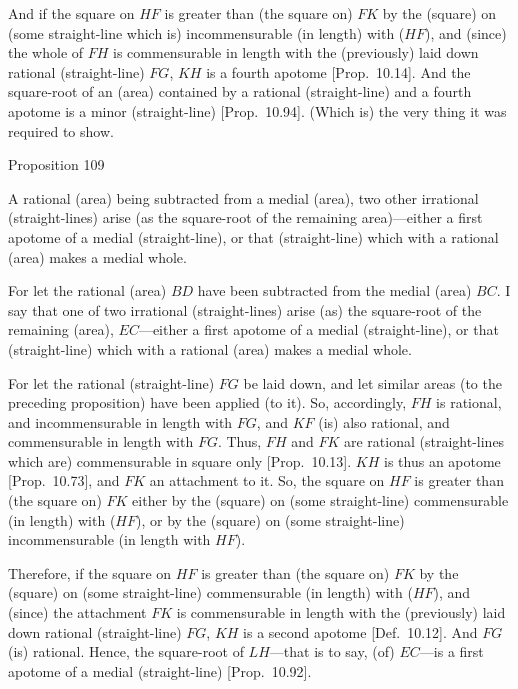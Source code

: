 And if the square on  $HF$ is greater than (the square on) $FK$ by the
(square) on (some straight-line which is) incommensurable (in length) with ($HF$),
and (since) the whole of $FH$ is commensurable in length with
the (previously) laid down rational (straight-line) $FG$, $KH$ is a fourth
apotome [Prop.~10.14]. And the square-root
of an (area) contained by a rational (straight-line) and a fourth apotome
is a minor (straight-line)
[Prop.~10.94]. (Which is) the very thing it was required to show.


\begin{center}
{\large Proposition 109}
\end{center}

A rational (area) being subtracted from
a medial (area), two other irrational (straight-lines) arise (as the square-root
of the remaining area)---either a first apotome of a medial (straight-line),
or that (straight-line) which with a rational (area) makes a medial whole.

For let the rational (area) $BD$ have been subtracted from the medial
(area) $BC$. I say that one of two irrational (straight-lines) arise (as) the square-root of the remaining (area), $EC$---either a first apotome of a medial
(straight-line), or that (straight-line) which with a rational (area) makes
a medial whole.

For let the rational (straight-line) $FG$ be laid down, and let
similar areas (to the preceding proposition) have  been applied (to it). So,
accordingly, $FH$ is rational, and incommensurable in length with
$FG$, and $KF$ (is) also rational, and commensurable
in length with $FG$. Thus, $FH$ and $FK$ are rational (straight-lines which
are) commensurable in square only [Prop.~10.13].
$KH$ is thus an apotome [Prop.~10.73], and $FK$ an attachment to it. So, the square on $HF$ is greater than (the square on)
$FK$ either by the (square) on (some straight-line) commensurable (in length)
with ($HF$), or by the (square) on (some straight-line) incommensurable
(in length with $HF$).

\centerline{}

Therefore, if the square on $HF$ is greater than (the square on) $FK$
by the (square) on (some straight-line) commensurable (in length) with ($HF$),
and (since) the attachment $FK$ is commensurable
in length with the (previously) laid down rational (straight-line) $FG$,
$KH$ is a second apotome [Def.~10.12]. 
And $FG$ (is) rational. Hence, the square-root of $LH$---that is to say, (of)
$EC$---is a first apotome of a medial (straight-line) [Prop.~10.92].


